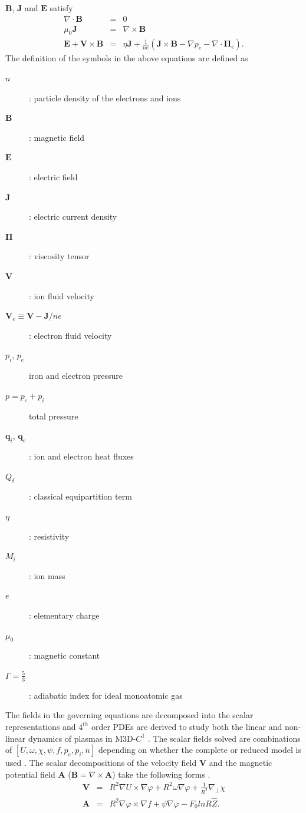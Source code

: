 \documentclass[11pt]{article}  %
\begin{document}
$\mathbf{B}$, $\mathbf{J}$ and $\mathbf{E}$ satisfy
\begin{subequations} 
\begin{eqnarray}
\nabla \cdot \mathbf{B} &=& 0 \\
\mu_0 \mathbf{J} &=& \nabla \times \mathbf{B}  \label{eqn:jeqn} \\
\mathbf{E}+\mathbf{V} \times \mathbf{B} & =& \eta \mathbf{J} + \frac{1}{ne}(\mathbf{J} \times \mathbf{B} - \nabla p_e -\nabla \cdot \mathbf{\Pi}_e). \label{eqn:elec}
\end{eqnarray}
\end{subequations}
The definition of the symbols in the above equations are defined as
\begin{description}
\item[$n$]: particle density  of the electrons and ions
\item[$\mathbf{B}$]: magnetic field
\item[$\mathbf{E}$]: electric field
\item[$\mathbf{J}$ ]: electric current density
\item[$\mathbf{\Pi}$]: viscosity tensor
\item[$\mathbf{V}$]: ion fluid velocity
\item[$\mathbf{V}_e\equiv \mathbf{V}-\mathbf{J}/ne$]: electron fluid velocity
\item[$p_i$, $p_e$] iron and electron pressure
\item[$p=p_e+p_i$] total pressure
\item[$\mathbf{q}_i$, $\mathbf{q}_e$]: ion  and electron heat fluxes
\item[$Q_{\delta}$]: classical equipartition term
\item[$\eta$]: resistivity
\item[$M_i$]: ion mass
\item[$e$]: elementary charge
\item[$\mu_0$]:  magnetic constant 
\item[$\Gamma = \frac{5}{3}$]: adiabatic index for ideal monoatomic gas
\end{description}
 
The fields in the governing equations are decomposed into the scalar representations and $4^{th}$ order PDEs are derived to study both the linear and non-linear dynamics of plasmas  in M3D-$C^1$ \cite{jardin2012multiple, Jardin2014Extend}. The scalar fields solved are combinations of $[U,\omega,\chi,\psi,f,p_e,p_i,n]$ depending on whether the complete or reduced model is used \cite{ Jardin2014Extend}. The scalar decompositions of the velocity field $\mathbf{V}$ and the magnetic potential field $\mathbf{A}$ ($\mathbf{B}=\nabla\times\mathbf{A}$) take the following forms \cite{Jardin2014Extend}.
\begin{subequations}  \label{eqn:scalarDecompsition}
\begin{eqnarray}
\mathbf{V}&=&R^2\nabla U \times \nabla \varphi + R^2\omega\nabla\varphi+\frac{1}{R^2}\nabla_\perp\chi \\
\mathbf{A}&=&R^2\nabla \varphi \times \nabla f +\psi\nabla\varphi -F_0lnR\hat{Z}.
\end{eqnarray}
\end{subequations}
\end{document}
